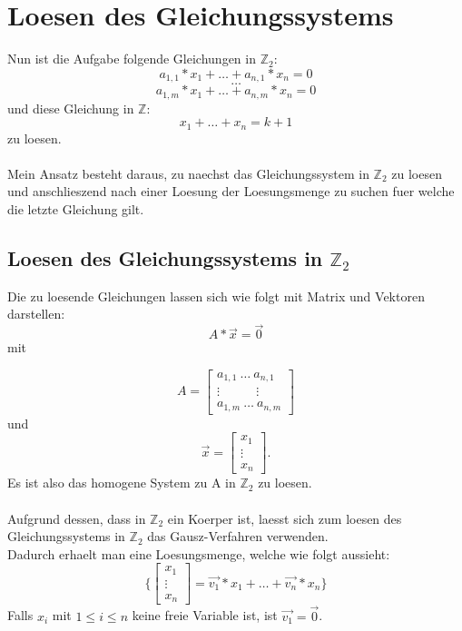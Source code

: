 \documentclass[a4paper,10pt,ngerman]{scrartcl}
\begin{document}
\section{Loesen des Gleichungssystems}
Nun ist die Aufgabe folgende Gleichungen in \(\mathbb{Z}_{2}\):
\[a_{1, 1} * x_1 + \dots + a_{n, 1} * x_n = 0\]
\[\dots\]
\[a_{1, m} * x_1 + \dots + a_{n, m}  * x_n = 0\]
und diese Gleichung in \(\mathbb{Z}\):
\[x_1 + \dots + x_n = k + 1\]
zu loesen.\\\\
Mein Ansatz besteht daraus, zu naechst das Gleichungssystem in \(\mathbb{Z}_{2}\) zu loesen und anschlieszend nach einer Loesung der Loesungsmenge zu suchen fuer welche die letzte Gleichung gilt.

\subsection{Loesen des Gleichungssystems in \(\mathbb{Z}_{2}\)}
Die zu loesende Gleichungen lassen sich wie folgt mit Matrix und Vektoren darstellen:
\[A * \vec{x} = \vec{0}\]
mit

\[A = \begin{bmatrix}
           a_{1, 1} \ \dots \ a_{n, 1} \\
           \vdots \ \ \ \ \ \ \ \ \ \ \ \ \ \vdots \\
           a_{1, m} \ \dots \ a_{n, m}
         \end{bmatrix} 
\] 
und
\[\vec{x} = \begin{bmatrix}
           x_{1} \\
           \vdots \\
           x_{n}
         \end{bmatrix} .
\]
Es ist also das homogene System zu A in \(\mathbb{Z}_{2}\) zu loesen.\\\\
Aufgrund dessen, dass in \(\mathbb{Z}_{2}\) ein Koerper ist, laesst sich zum loesen des Gleichungssystems in \(\mathbb{Z}_{2}\) das Gausz-Verfahren verwenden.\\
Dadurch erhaelt man eine Loesungsmenge, welche wie folgt aussieht:
\[ \{ \begin{bmatrix}
           x_{1} \\
           \vdots \\
           x_{n}
         \end{bmatrix} = \vec{v_1} * x_1 + \dots + \vec{v_n} * x_n \} 
\]
Falls \(x_i\) mit \(1 \leq i \leq n\) keine freie Variable ist, ist \(\vec{v_1} = \vec{0}\).			
\end{document}
